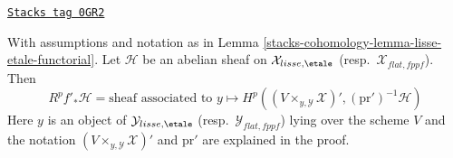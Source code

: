 \begin{lemma}
\label{stacks-cohomology-lemma-lisse-etale-functorial-pushforward}
\href{https://stacks.math.columbia.edu/tag/0GR2}{\texttt{Stacks tag 0GR2}}

With assumptions and notation as in Lemma \ref{stacks-cohomology-lemma-lisse-etale-functorial}.
Let $\mathcal{H}$  be an abelian sheaf on $\mathcal{X}_{lisse,\etale}$
(resp.\ $\mathcal{X}_{flat,fppf}$). Then
\begin{equation}
\label{equation-higher-direct-image-lisse-etale}
R^pf'_*\mathcal{H} =
\text{sheaf associated to }y \longmapsto
H^p((V \times_{y, \mathcal{Y}} \mathcal{X})', (\text{pr}')^{-1}\mathcal{H})
\end{equation}
Here $y$ is an object of $\mathcal{Y}_{lisse,\etale}$
(resp.\ $\mathcal{Y}_{flat,fppf}$) lying over the scheme $V$
and the notation $(V \times_{y, \mathcal{Y}} \mathcal{X})'$
and $\text{pr}'$ are explained in the proof.
\end{lemma}

